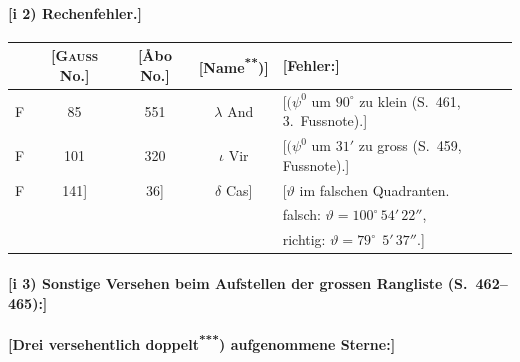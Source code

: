 \documentclass[12pt,a4paper]{article}
\theoremstyle{plain}
\theoremstyle{definition}
\theoremstyle{remark}
\begin{document}
\newpage
\paragraph*{[i 2) Rechenfehler.]}

\begin{small}
\begin{center}
\begin{tabular}{|c|c|c|c|l|}
\hline
[Signatur\textsuperscript{*})] & [\textsc{Gau\ss} No.] & [\AA bo No.] & [Name\textsuperscript{**})] & [Fehler:] \\
\hline
F & 85 & 551 & $\lambda$ And & [$(\psi^{0}$ um $90^{\circ}$ zu klein (S.~461, 3.~Fussnote).] \\
F & 101 & 320 & $\iota$ Vir & [$(\psi^{0}$ um $31'$ zu gross (S.~459, Fussnote).] \\
F & 141] & 36] & $\delta$ Cas] & [$\vartheta$ im falschen Quadranten. \\
& & & & \hspace{1cm}falsch: $\vartheta = 100^{\circ}\,54'\,22''$, \\
& & & & \hspace{1cm}richtig: $\vartheta = 79^{\circ}\;\,5'\,37''$.] \\
\hline
\end{tabular}
\end{center}
\end{small}

\paragraph*{[i 3) Sonstige Versehen beim Aufstellen der grossen Rangliste (S.~462--465):]}

\begin{small}
\textbf{[Drei versehentlich doppelt\textsuperscript{***}) aufgenommene Sterne:]}
\end{small}
\end{document}

